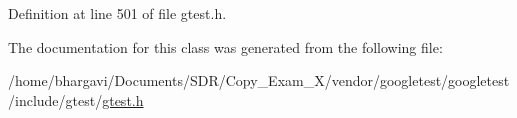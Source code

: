 Definition at line 501 of file gtest.\+h.



The documentation for this class was generated from the following file\+:\begin{DoxyCompactItemize}
\item 
/home/bhargavi/\+Documents/\+S\+D\+R/\+Copy\+\_\+\+Exam\+\_\+X/vendor/googletest/googletest/include/gtest/\hyperlink{gtest_8h}{gtest.\+h}\end{DoxyCompactItemize}
